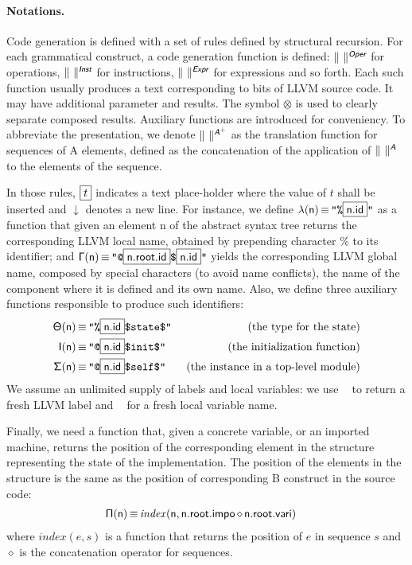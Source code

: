 \documentclass{llncs}
\newcommand{\trad}[2]{\ensuremath{\lVert \textsf{#1} \rVert^{\textit{#2}}}}
\newcommand{\nl}[0]{\ensuremath{\downarrow}}
\DeclareMathOperator{\conc}{\diamond}
\DeclareMathOperator{\isdef}{\equiv}
\DeclareMathOperator{\lbl}{\mathcal{L}()}
\DeclareMathOperator{\variable}{\mathcal{V}()}
\newcommand{\llvm}[1]{\texttt{#1}}
\newcommand{\B}[1]{\textsf{#1}}
\newcommand{\ListOf}[1]{$\mbox{#1}^+$}
\newcommand{\PH}[1]{\framebox{$#1$}}
\newcommand{\sep}[0]{\otimes}
\newcommand{\Global}[0]{\ensuremath{\sf\Gamma}}
\newcommand{\local}[0]{\ensuremath{\sf\lambda}}
\newcommand{\idx}[0]{\ensuremath{\sf\Pi}}
\newcommand{\state}[0]{\ensuremath{\sf\Theta}}
\newcommand{\self}[0]{\ensuremath{\sf\Sigma}}
\newcommand{\init}[0]{\ensuremath{\mathsf{I}}}
\begin{document}
\paragraph{Notations.} Code generation is defined with a set of rules defined by
structural recursion. For each grammatical construct, a code generation function
is defined: $\trad{~}{\B{Oper}}$ for operations, $\trad{~}{\B{Inst}}$ for
instructions, $\trad{~}{\B{Expr}}$ for expressions and so forth. Each such
function usually produces a text corresponding to bits of LLVM source code. It
may have additional parameter and results. The symbol $\sep$ is used to clearly
separate composed results. Auxiliary functions are introduced for
conveniency. To abbreviate the presentation, we denote
$\trad{~}{\ListOf{\B{A}}}$ as the translation function for sequences of \B{A}
elements, defined as the concatenation of the application of $\trad{~}{\B{A}}$
to the elements of the sequence.

In those rules, $\PH{t}$ indicates a text place-holder where the value of $t$
shall be inserted and $\nl$ denotes a new line. For instance, we define
$\local(\B{n}) \isdef \llvm{"\%\PH{\B{n.id}}"}$ as a function that given an
element \B{n} of the abstract syntax tree returns the corresponding LLVM local
name, obtained by prepending character \% to its identifier; and $\Global(\B{n})
\isdef \llvm{"@\PH{\B{n.root.id}}\$\PH{\B{n.id}}"}$ yields the corresponding
LLVM global name, composed by special characters (to avoid name conflicts), the
name of the component where it is defined and its own name.  Also, we define
three auxiliary functions responsible to produce such identifiers:
\begin{align*}
\state(\B{n}) & \isdef \llvm{"\%\PH{\B{n.id}}\$state\$"} & \text{ (the type for the state)} \\
\init(\B{n}) & \isdef \llvm{"@\PH{\B{n.id}}\$init\$"} & \text{ (the initialization function)} \\
\self(\B{n}) & \isdef \llvm{"@\PH{\B{n.id}}\$self\$"} & \text{ (the instance in a top-level module)}
\end{align*}
We assume an unlimited supply of labels and local variables: we use $\lbl$ to
return a fresh LLVM label and $\variable$ for a fresh local variable name.

Finally, we need a function that, given a concrete variable, or an imported
machine, returns the position of the corresponding element in the structure
representing the state of the implementation. The position of the elements in
the structure is the same as the position of corresponding B construct in the
source code:
\begin{align*}
  \idx(\B{n}) & \isdef \mathit{index}(\B{n}, \B{n.root.impo} \conc
\B{n.root.vari})
\end{align*}
where $\mathit{index}(e, s)$ is a function that returns the position of $e$ in
sequence $s$ and $\conc$ is the concatenation operator for sequences.
\end{document}

